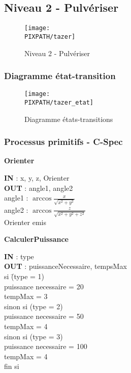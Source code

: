 \subsection{Niveau 2 - Pulvériser}

\begin{center}
\begin{figure}[!h]
\texttt{[image: \\PIXPATH/tazer]}
\caption{Niveau 2 - Pulvériser}
\end{figure}
\end{center}


\subsubsection{Diagramme état-transition}

\begin{center}
\begin{figure}[!h]
\texttt{[image: \\PIXPATH/tazer\_etat]}
\caption{Diagramme états-transitions}
\end{figure}
\end{center}

\vfill
\pagebreak

\subsubsection{Processus primitifs - C-Spec}

\begin{description}
	
	\item \textbf{Orienter}
		\begin{tabbing} 
		\textbf{IN} : x, y, z, Orienter \\
		\textbf{OUT} : angle1, angle2 \\
		angle1 : $\arccos{\frac{x}{\sqrt{x^2+y^2}}}$ \\
		angle2 : $\arccos{\frac{z}{\sqrt{x^2+y^2+z^2}}}$ \\
		Orienter emis
		\end{tabbing}

	\item \textbf{CalculerPuissance}
		\begin{tabbing} 
		\textbf{IN} : type \\
		\textbf{OUT} : puissanceNecessaire, tempsMax \\
		si \=(type = 1) \\
			\>puissance necessaire = 20 \\
			\>tempMax = 3 \\
		sinon si (type = 2) \\
			\>puissance necessaire = 50 \\
			\>tempMax = 4 \\
		sinon si (type = 3) \\
			\>puissance necessaire = 100 \\
			\>tempMax = 4 \\
		fin si
		\end{tabbing} 


\end{description}

\vfill
\pagebreak

